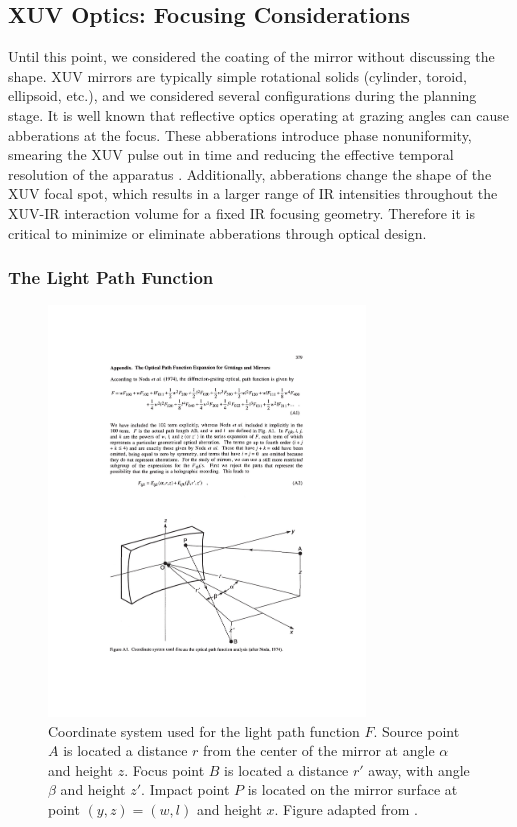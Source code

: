 \subsection{XUV Optics: Focusing Considerations}

Until this point, we considered the coating of the mirror without discussing the shape. XUV mirrors are typically simple rotational solids (cylinder, toroid, ellipsoid, etc.), and we considered several configurations during the planning stage. It is well known that reflective optics operating at grazing angles can cause abberations at the focus. These abberations introduce phase nonuniformity, smearing the XUV pulse out in time and reducing the effective temporal resolution of the apparatus \cite{bourassin-bouchetHowFocusAttosecond2013}. Additionally, abberations change the shape of the XUV focal spot, which results in a larger range of IR intensities throughout the XUV-IR interaction volume for a fixed IR focusing geometry. Therefore it is critical to minimize or eliminate abberations through optical design.

\subsubsection{The Light Path Function}

\begin{figure}
	\centering
	\includegraphics[width=0.75\textwidth]{figures/chap2/LPF_geometry.pdf}
	\caption{Coordinate system used for the light path function $F$. Source point $A$ is located a distance $r$ from the center of the mirror at angle $\alpha$ and height $z$. Focus point $B$ is located a distance $r'$ away, with angle $\beta$ and height $z'$. Impact point $P$ is located on the mirror surface at point $(y,z) = (w,l)$ and height $x$. Figure adapted from \cite{howellsMirrorsSynchrotronRadiationBeamlines1994}.}
	\label{fig:LPF_geometry}
\end{figure}


